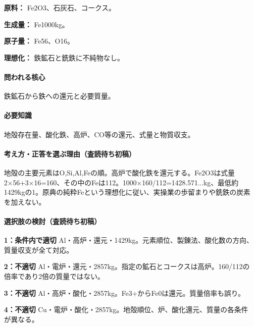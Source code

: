 \noindent\textbf{原料：} Fe2O3、石灰石、コークス。\par

\noindent\textbf{生成量：} Fe1000kg。\par

\noindent\textbf{原子量：} Fe56、O16。\par

\noindent\textbf{理想化：} 鉄鉱石と銑鉄に不純物なし。\par

\paragraph{問われる核心} 鉄鉱石から鉄への還元と必要質量。

\paragraph{必要知識} 地殻存在量、酸化鉄、高炉、CO等の還元、式量と物質収支。

\paragraph{考え方・正答を選ぶ理由（査読待ち初稿）} 地殻の主要元素はO,Si,Al,Feの順。高炉で酸化鉄を還元する。Fe2O3は式量2×56+3×16=\allowbreak{}160、その中のFeは112。1000×160/112=\allowbreak{}1428.571...kg、最低約1429kgの1。原典の純粋Feという理想化に従い、実操業の歩留まりや銑鉄の炭素を加えない。

\paragraph{選択肢の検討（査読待ち初稿）}\mbox{}\par

\noindent\textbf{1：条件内で適切} Al・高炉・還元・1429kg。元素順位、製錬法、酸化数の方向、質量収支が全て対応。\par

\noindent\textbf{2：不適切} Al・電炉・還元・2857kg。指定の鉱石とコークスは高炉。160/112の倍率であり2倍の質量ではない。\par

\noindent\textbf{3：不適切} Al・高炉・酸化・2857kg。Fe3+からFe0は還元。質量倍率も誤り。\par

\noindent\textbf{4：不適切} Cu・電炉・酸化・2857kg。地殻順位、炉、酸化還元、質量の各条件が異なる。\par

